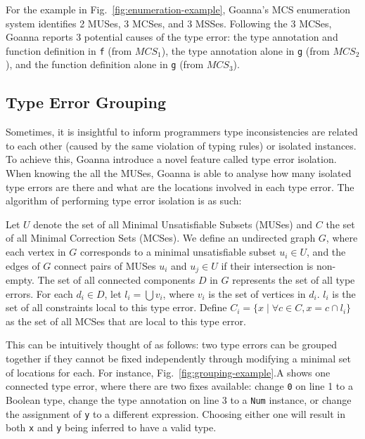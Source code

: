 \documentclass[pdflatex,sn-mathphys-num]{sn-jnl}%
\begin{document}
   For the example in Fig.~\ref{fig:enumeration-example}, Goanna's MCS enumeration system identifies 2 MUSes, 3 MCSes, and 3 MSSes. Following the 3 MCSes, Goanna reports 3 potential causes of the type error: the type annotation and function definition in \texttt{f} (from $MCS_1$), the type annotation alone in \texttt{g} (from $MCS_2$), and the function definition alone in \texttt{g} (from $MCS_3$). 

 
\subsection{Type Error Grouping} \label{sub:grouping}

Sometimes, it is insightful to inform programmers type inconsistencies are related to each other (caused by the same violation of typing rules) or isolated instances. To achieve this, Goanna introduce a novel feature called type error isolation. When knowing the all the MUSes, Goanna is able to analyse how many isolated type errors are there and what are the locations involved in each type error. The algorithm of performing type error isolation is as such:


	Let $U$ denote the set of all Minimal Unsatisfiable Subsets (MUSes) and $C$ the set of all Minimal Correction Sets (MCSes). We define an undirected graph $G$, where each vertex in $G$ corresponds to a minimal unsatisfiable subset $u_i \in U$, and the edges of $G$ connect pairs of MUSes $u_i$ and $u_j \in U$ if their intersection is non-empty. The set of all connected components $D$ in $G$ represents the set of all type errors. For each $d_i \in D$, let $l_i = \bigcup v_i$, where $v_i$ is the set of vertices in $d_i$. $l_i$ is the set of all constraints local to this type error. Define $C_i = \{ x \mid \forall c \in C, x = c \cap l_i \}$ as the set of all MCSes that are local to this type error.


    This can be intuitively thought of as follows: two type errors can be grouped together if they cannot be fixed independently through modifying a minimal set of locations for each. For instance, Fig.~\ref{fig:grouping-example}.A shows one connected type error, where there are two fixes available: change \texttt{0} on line 1 to a Boolean type, change the type annotation on line 3 to a \texttt{Num} instance, or change the assignment of \texttt{y} to a different expression. Choosing either one will result in both \texttt{x} and \texttt{y} being inferred to have a valid type.
    
\end{document}
